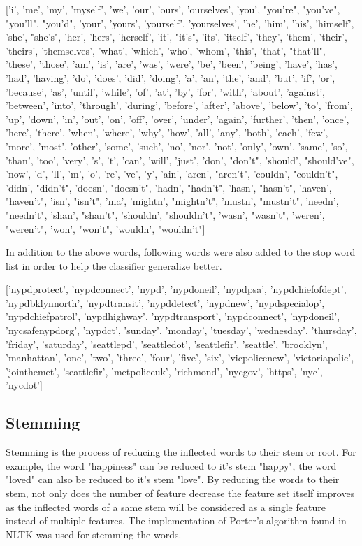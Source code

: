 ['i', 'me', 'my', 'myself', 'we', 'our', 'ours', 'ourselves', 'you', "you're", "you've", "you'll", "you'd", 'your', 'yours', 'yourself', 'yourselves', 'he', 'him', 'his', 'himself', 'she', "she's", 'her', 'hers', 'herself', 'it', "it's", 'its', 'itself', 'they', 'them', 'their', 'theirs', 'themselves', 'what', 'which', 'who', 'whom', 'this', 'that', "that'll", 'these', 'those', 'am', 'is', 'are', 'was', 'were', 'be', 'been', 'being', 'have', 'has', 'had', 'having', 'do', 'does', 'did', 'doing', 'a', 'an', 'the', 'and', 'but', 'if', 'or', 'because', 'as', 'until', 'while', 'of', 'at', 'by', 'for', 'with', 'about', 'against', 'between', 'into', 'through', 'during', 'before', 'after', 'above', 'below', 'to', 'from', 'up', 'down', 'in', 'out', 'on', 'off', 'over', 'under', 'again', 'further', 'then', 'once', 'here', 'there', 'when', 'where', 'why', 'how', 'all', 'any', 'both', 'each', 'few', 'more', 'most', 'other', 'some', 'such', 'no', 'nor', 'not', 'only', 'own', 'same', 'so', 'than', 'too', 'very', 's', 't', 'can', 'will', 'just', 'don', "don't", 'should', "should've", 'now', 'd', 'll', 'm', 'o', 're', 've', 'y', 'ain', 'aren', "aren't", 'couldn', "couldn't", 'didn', "didn't", 'doesn', "doesn't", 'hadn', "hadn't", 'hasn', "hasn't", 'haven', "haven't", 'isn', "isn't", 'ma', 'mightn', "mightn't", 'mustn', "mustn't", 'needn', "needn't", 'shan', "shan't", 'shouldn', "shouldn't", 'wasn', "wasn't", 'weren', "weren't", 'won', "won't", 'wouldn', "wouldn't"]

In addition to the above words, following words were also added to the stop word list in order to help the classifier generalize better.

['nypdprotect', 'nypdconnect', 'nypd', 'nypdoneil', 'nypdpsa', 'nypdchiefofdept', 'nypdbklynnorth', 'nypdtransit', 'nypddetect', 'nypdnew', 'nypdspecialop', 'nypdchiefpatrol', 'nypdhighway', 'nypdtransport', 'nypdconnect', 'nypdoneil', 'nycsafenypdorg', 'nypdct', 'sunday', 'monday', 'tuesday', 'wednesday', 'thursday', 'friday', 'saturday', 'seattlepd', 'seattledot', 'seattlefir', 'seattle', 'brooklyn', 'manhattan', 'one', 'two', 'three', 'four', 'five', 'six', 'vicpolicenew', 'victoriapolic', 'jointhemet', 'seattlefir', 'metpoliceuk', 'richmond', 'nycgov', 'https', 'nyc', 'nycdot']

\subsection{Stemming}
Stemming is the process of reducing the inflected words to their stem or root. For example, the word "happiness" can be reduced to it's stem "happy", the word "loved" can also be reduced to it's stem "love". By reducing the words to their stem, not only does the number of feature decrease the feature set itself improves as the inflected words of a same stem will be considered as a single feature instead of multiple features. The implementation of Porter's algorithm\cite{porter1980algorithm} found in NLTK was used for stemming the words.

